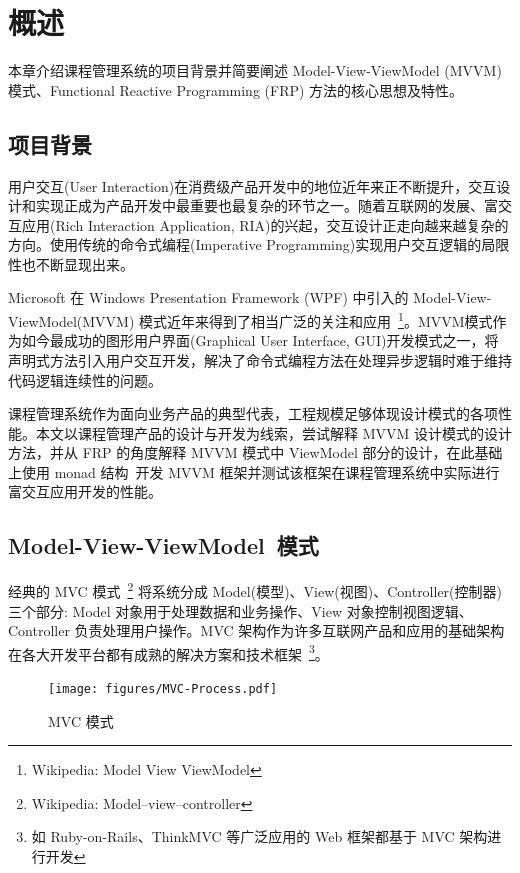 \chapter{概述}

本章介绍课程管理系统的项目背景并简要阐述 Model-View-ViewModel (MVVM) 模式、Functional Reactive Programming (FRP) 方法的核心思想及特性。

\section{项目背景}

用户交互(User Interaction)在消费级产品开发中的地位近年来正不断提升，交互设计和实现正成为产品开发中最重要也最复杂的环节之一。随着互联网的发展、富交互应用(Rich Interaction Application, RIA)的兴起，交互设计正走向越来越复杂的方向。使用传统的命令式编程(Imperative Programming)实现用户交互逻辑的局限性也不断显现出来。

Microsoft 在 Windows Presentation Framework (WPF) 中引入的 Model-View-ViewModel(MVVM) 模式近年来得到了相当广泛的关注和应用~\footnote{Wikipedia: Model View ViewModel}。MVVM模式作为如今最成功的图形用户界面(Graphical User Interface, GUI)开发模式之一，将声明式方法引入用户交互开发，解决了命令式编程方法在处理异步逻辑时难于维持代码逻辑连续性的问题。

课程管理系统作为面向业务产品的典型代表，工程规模足够体现设计模式的各项性能。本文以课程管理产品的设计与开发为线索，尝试解释 MVVM 设计模式的设计方法，并从 FRP 的角度解释 MVVM 模式中 ViewModel 部分的设计，在此基础上使用 monad 结构~\cite{raey}开发 MVVM 框架并测试该框架在课程管理系统中实际进行富交互应用开发的性能。

\section{Model-View-ViewModel~模式}

经典的 MVC 模式~\footnote{Wikipedia: Model–view–controller} 将系统分成 Model(模型)、View(视图)、Controller(控制器) 三个部分: Model 对象用于处理数据和业务操作、View 对象控制视图逻辑、Controller 负责处理用户操作。MVC 架构作为许多互联网产品和应用的基础架构在各大开发平台都有成熟的解决方案和技术框架~\footnote{如 Ruby-on-Rails、ThinkMVC 等广泛应用的 Web 框架都基于 MVC 架构进行开发}。

\begin{figure}[!h]
\begin{center}
\texttt{[image: figures/MVC-Process.pdf]}
\caption{MVC 模式\label{MVCOverview}}
\end{center}
\end{figure}


